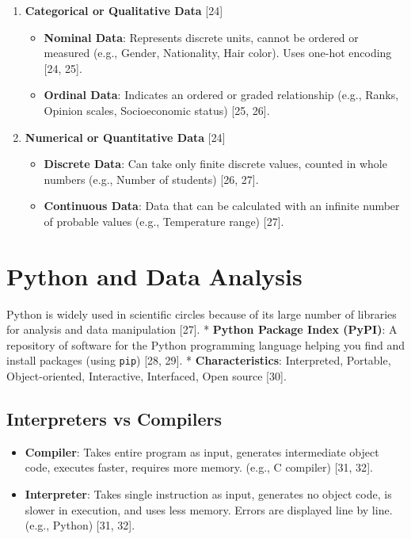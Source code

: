 \documentclass[
  letterpaper,
  DIV=11,
  numbers=noendperiod]{scrreprt}
\providecommand{\tightlist}{%
  \setlength{\itemsep}{0pt}\setlength{\parskip}{0pt}}
\begin{document}
\begin{enumerate}
\def\labelenumi{\arabic{enumi}.}
\tightlist
\item
  \textbf{Categorical or Qualitative Data} {[}24{]}

  \begin{itemize}
  \tightlist
  \item
    \textbf{Nominal Data}: Represents discrete units, cannot be ordered
    or measured (e.g., Gender, Nationality, Hair color). Uses one-hot
    encoding {[}24, 25{]}.
  \item
    \textbf{Ordinal Data}: Indicates an ordered or graded relationship
    (e.g., Ranks, Opinion scales, Socioeconomic status) {[}25, 26{]}.
  \end{itemize}
\item
  \textbf{Numerical or Quantitative Data} {[}24{]}

  \begin{itemize}
  \tightlist
  \item
    \textbf{Discrete Data}: Can take only finite discrete values,
    counted in whole numbers (e.g., Number of students) {[}26, 27{]}.
  \item
    \textbf{Continuous Data}: Data that can be calculated with an
    infinite number of probable values (e.g., Temperature range)
    {[}27{]}.
  \end{itemize}
\end{enumerate}

\section{Python and Data Analysis}\label{python-and-data-analysis}

Python is widely used in scientific circles because of its large number
of libraries for analysis and data manipulation {[}27{]}. *
\textbf{Python Package Index (PyPI)}: A repository of software for the
Python programming language helping you find and install packages (using
\texttt{pip}) {[}28, 29{]}. * \textbf{Characteristics}: Interpreted,
Portable, Object-oriented, Interactive, Interfaced, Open source
{[}30{]}.

\subsection{Interpreters vs Compilers}\label{interpreters-vs-compilers}

\begin{itemize}
\tightlist
\item
  \textbf{Compiler}: Takes entire program as input, generates
  intermediate object code, executes faster, requires more memory.
  (e.g., C compiler) {[}31, 32{]}.
\item
  \textbf{Interpreter}: Takes single instruction as input, generates no
  object code, is slower in execution, and uses less memory. Errors are
  displayed line by line. (e.g., Python) {[}31, 32{]}.
\end{itemize}
\end{document}
